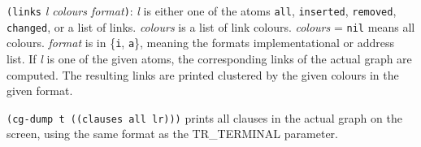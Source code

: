 {\tt (links} {\em l colours format}{\tt )}: {\em l} is either one of
the atoms {\tt all}, {\tt inserted}, {\tt removed}, {\tt changed}, or
a list of links. {\em colours} is a list of
link colours. {\em colours} = {\tt nil} means all colours.  {\em
format} is in \{{\tt i}, {\tt a}\}, meaning the formats
implementational or address list. If
{\em l} is one of the given atoms, the corresponding links of the actual
graph are computed. The resulting
links are printed clustered by the given colours in the given format.


\Ex

{\tt (cg-dump t ((clauses all lr)))} prints all clauses in the actual
graph on the screen, using the same format as the TR\_TERMINAL parameter.
